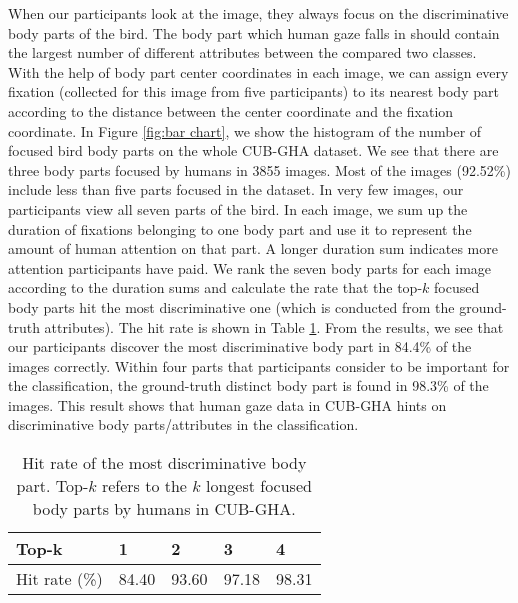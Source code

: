 \documentclass{bmvc2k}
\begin{document}
When our participants look at the image, they always focus on the discriminative body parts of the bird. The body part which human gaze falls in should contain the largest number of different attributes between the compared two classes. With the help of body part center coordinates in each image, we can assign every fixation (collected for this image from five participants) to its nearest body part according to the distance between the center coordinate and the fixation coordinate. In Figure \ref{fig:bar chart}, we show the histogram of the number of focused bird body parts on the whole CUB-GHA dataset. We see that there are three body parts focused by humans in 3855 images. Most of the images (92.52\%) include less than five parts focused in the dataset. In very few images, our participants view all seven parts of the bird. In each image, we sum up the duration of fixations belonging to one body part and use it to represent the amount of human attention on that part. A longer duration sum indicates more attention participants have paid. We rank the seven body parts for each image according to the duration sums and calculate the rate that the top-$k$ focused body parts hit the most discriminative one (which is conducted from the ground-truth attributes). The hit rate is shown in Table \ref{tab:hit rate}.
From the results, we see that our participants discover the most discriminative body part in 84.4\% of the images correctly. Within four parts that participants consider to be important for the classification, the ground-truth distinct body part is found in 98.3\% of the images. This result shows that human gaze data in CUB-GHA hints on discriminative body parts/attributes in the classification.

\begin{table}[h]
\centering
\begin{tabular}{|l|l|l|l|l|}
\hline
Top-k         & 1     & 2     & 3     & 4     \\ \hline\hline
Hit rate (\%) & 84.40 & 93.60 & 97.18 & 98.31 \\ \hline
\end{tabular}
\vspace{0.5cm}
\caption{Hit rate of the most discriminative body part. Top-$k$ refers to the $k$ longest focused body parts by humans in CUB-GHA.}
\label{tab:hit rate}
\end{table}
\end{document}
